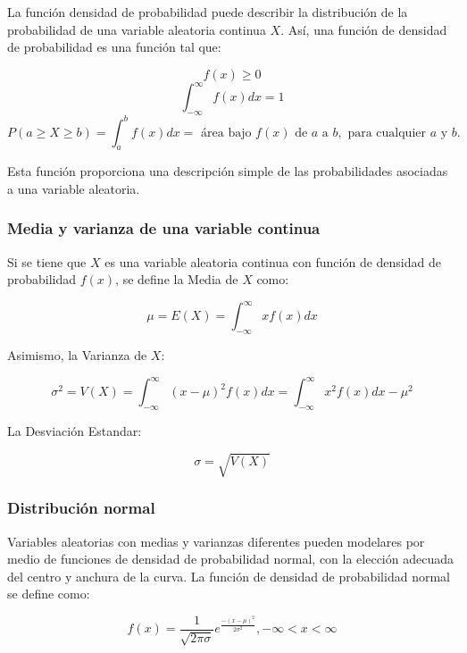 La función densidad de probabilidad puede describir la distribución de la probabilidad de una variable aleatoria continua $X$. Así, una función de densidad de probabilidad es una función tal que:


 $$f(x)\geqslant 0$$
 $$\int_{-\infty}^{\infty}f(x)dx=1$$
 \begin{equation*}
 P(a\geqslant X \geqslant b)=\int_{a}^{b}f(x)dx= \text{ área bajo } f(x) \text{ de } a \text{ a } b, \text{ para cualquier } a \text{ y } b.
 \end{equation*}



Esta función proporciona una descripción simple de las probabilidades asociadas a una variable aleatoria.
\subsubsection{Media y varianza de una variable continua}

Si se tiene que $X$ es una variable aleatoria continua con función de densidad de probabilidad $f(x)$, se define la Media de $X$ como:

\begin{equation*}
\mu=E(X)=\int_{-\infty}^{\infty}xf(x)dx
\end{equation*}

Asimismo, la Varianza de $X$:

\begin{equation*}
\sigma^2=V(X)=\int_{-\infty}^{\infty}(x-\mu)^{2}f(x)dx=\int_{-\infty}^{\infty}x^{2}f(x)dx-\mu^2
\end{equation*}

La Desviación Estandar:

\begin{equation*}
\sigma=\sqrt{V(X)}
\end{equation*}

\subsubsection{Distribución normal}

Variables aleatorias con medias y varianzas diferentes pueden modelares por medio de funciones de densidad de probabilidad normal, con la elección adecuada del centro y anchura de la curva. La función de densidad de probabilidad normal se define como:

\begin{equation*}
f(x)=\frac{1}{\sqrt{2\pi\sigma}}e^{\frac{-(x-\mu)^2}{2\sigma^2}}  ,  -\infty<x<\infty
\end{equation*}

